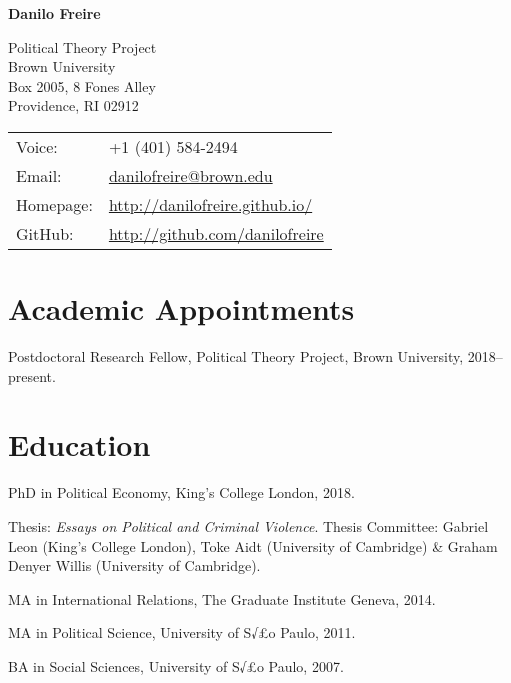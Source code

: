 \documentclass[a4paper]{article}
\def\name{Danilo Freire}
\renewenvironment{itemize}{
  \begin{list}{}{
    \setlength{\leftmargin}{1.5em}
  }
}{
  \end{list}
}
\begin{document}
{\huge \bf \name}


\vspace{0.25in}

\begin{minipage}{0.45\linewidth}
	Political Theory Project \\
	Brown University \\
	Box 2005, 8 Fones Alley \\
    Providence, RI 02912 
\end{minipage}
\begin{minipage}{0.45\linewidth}
	\begin{tabular}{ll}
	    Voice: & +1 (401) 584-2494 \\
		Email:          & \href{mailto:danilofreire@brown.edu}{danilofreire@brown.edu}          \\
		Homepage:       & \href{http://danilofreire.github.io/}{http://danilofreire.github.io/}             \\
		GitHub:         & \href{http://github.com/danilofreire}{http://github.com/danilofreire}
	\end{tabular}
\end{minipage}

\section*{Academic Appointments}

\begin{itemize}
	\item Postdoctoral Research Fellow, Political Theory Project, Brown University, 2018--present.
\end{itemize}

\section*{Education}

\begin{itemize}
	\item PhD in Political Economy, King's College London, 2018.
	\begin{itemize}
	    \item Thesis: \textit{Essays on Political and Criminal Violence}. Thesis Committee: Gabriel Leon (King's College London), Toke Aidt (University of Cambridge) \& Graham Denyer Willis (University of Cambridge).
	\end{itemize}
	\item MA in International Relations, The Graduate Institute Geneva, 2014.
	\item MA in Political Science, University of S√£o Paulo, 2011.
	\item BA in Social Sciences, University of S√£o Paulo, 2007.
\end{itemize}
\end{document}

